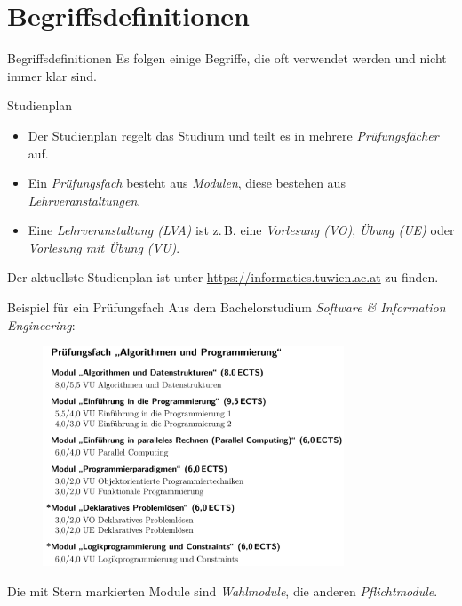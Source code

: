 \documentclass{beamer}
\begin{document}
\section{Begriffsdefinitionen}

\begin{frame}{Begriffsdefinitionen}
    Es folgen einige Begriffe, die oft verwendet werden und nicht immer klar
    sind.
\end{frame}

\begin{frame}{Studienplan}
    \begin{itemize}
        \item Der Studienplan regelt das Studium und teilt es in mehrere
              \textit{Prüfungsfächer} auf.
        \item Ein \textit{Prüfungsfach} besteht aus \textit{Modulen}, diese
              bestehen aus \textit{Lehrveranstaltungen}.
        \item Eine \textit{Lehrveranstaltung (LVA)} ist z.\,B. eine
              \textit{Vorlesung (VO)}, \textit{Übung (UE)} oder
              \textit{Vorlesung mit Übung (VU)}.
    \end{itemize}
    Der aktuellste Studienplan ist unter \url{https://informatics.tuwien.ac.at} zu finden.
\end{frame}

\begin{frame}{Beispiel für ein Prüfungsfach}
    Aus dem Bachelorstudium \textit{Software \& Information Engineering}: \\
    \begin{figure}[htp]
        \centering
        \includegraphics[width=0.8\textwidth]{pruefungsfach.png}
    \end{figure}
    \small Die mit Stern markierten Module sind \textit{Wahlmodule}, die anderen
          \textit{Pflichtmodule}.
\end{frame}
\end{document}
